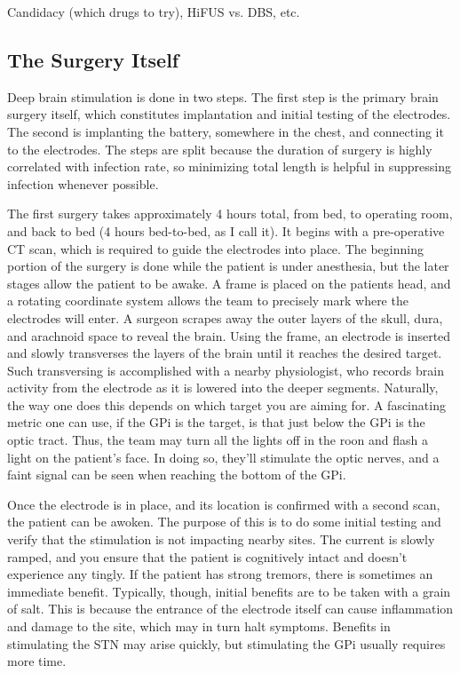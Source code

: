 \documentclass[12pt]{report}
\begin{document}
Candidacy (which drugs to try), HiFUS vs. DBS, etc. 


\subsection{The Surgery Itself}

Deep brain stimulation is done in two steps. The first step is the primary brain surgery itself, which constitutes implantation and initial testing of the electrodes. The second is implanting the battery, somewhere in the chest, and connecting it to the electrodes. The steps are split because the duration of surgery is highly correlated with infection rate, so minimizing total length is helpful in suppressing infection whenever possible.\newline

The first surgery takes approximately 4 hours total, from bed, to operating room, and back to bed (4 hours bed-to-bed, as I call it). It begins with a pre-operative CT scan, which is required to guide the electrodes into place. The beginning portion of the surgery is done while the patient is under anesthesia, but the later stages allow the patient to be awake. A frame is placed on the patients head, and a rotating coordinate system allows the team to precisely mark where the electrodes will enter. A surgeon scrapes away the outer layers of the skull, dura, and arachnoid space to reveal the brain. Using the frame, an electrode is inserted and slowly transverses the layers of the brain until it reaches the desired target. Such transversing is accomplished with a nearby physiologist, who records brain activity from the electrode as it is lowered into the deeper segments. Naturally, the way one does this depends on which target you are aiming for. A fascinating metric one can use, if the GPi is the target, is that just below the GPi is the optic tract. Thus, the team may turn all the lights off in the roon and flash a light on the patient's face. In doing so, they'll stimulate the optic nerves, and a faint signal can be seen when reaching the bottom of the GPi.\newline

Once the electrode is in place, and its location is confirmed with a second scan, the patient can be awoken. The purpose of this is to do some initial testing and verify that the stimulation is not impacting nearby sites. The current is slowly ramped, and you ensure that the patient is cognitively intact and doesn't experience any tingly. If the patient has strong tremors, there is sometimes an immediate benefit. Typically, though, initial benefits are to be taken with a grain of salt. This is because the entrance of the electrode itself can cause inflammation and damage to the site, which may in turn halt symptoms. Benefits in stimulating the STN may arise quickly, but stimulating the GPi usually requires more time. 
\end{document}
